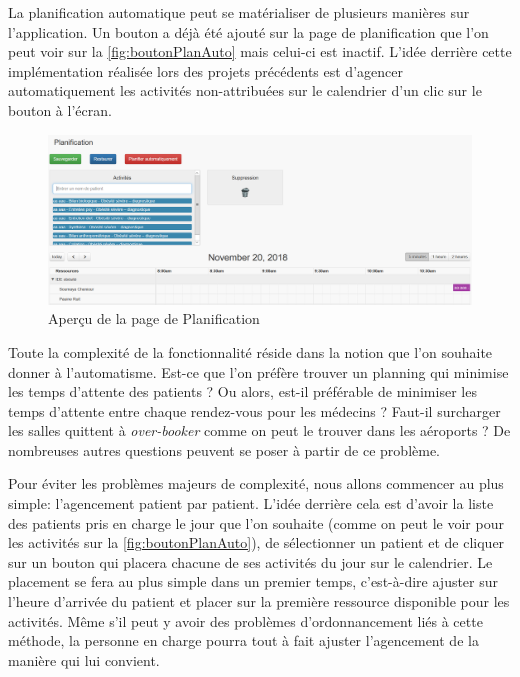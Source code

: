 \documentclass[noposter]{polytech/polytech}
\begin{document}
La planification automatique peut se matérialiser de plusieurs manières sur l'application. Un bouton a déjà été ajouté sur la page de planification que l'on peut voir sur la \autoref{fig:boutonPlanAuto} mais celui-ci est inactif. L'idée derrière cette implémentation réalisée lors des projets précédents est d'agencer automatiquement les activités non-attribuées sur le calendrier d'un clic sur le bouton à l'écran. 

\begin{figure}
	\includegraphics[scale=0.4]{images/bouton_plan_auto}
	\caption{Aperçu de la page de Planification}
	\label{fig:boutonPlanAuto}
\end{figure}

Toute la complexité de la fonctionnalité réside dans la notion que l'on souhaite donner à l'automatisme. Est-ce que l'on préfère trouver un planning qui minimise les temps d'attente des patients ? Ou alors, est-il préférable de minimiser les temps d'attente entre chaque rendez-vous pour les médecins ? Faut-il surcharger les salles quittent à \textit{over-booker} comme on peut le trouver dans les aéroports ? De nombreuses autres questions peuvent se poser à partir de ce problème.

Pour éviter les problèmes majeurs de complexité, nous allons commencer au plus simple: l'agencement patient par patient. L'idée derrière cela est d'avoir la liste des patients pris en charge le jour que l'on souhaite (comme on peut le voir pour les activités sur la \autoref{fig:boutonPlanAuto}), de sélectionner un patient et de cliquer sur un bouton qui placera chacune de ses activités du jour sur le calendrier. Le placement se fera au plus simple dans un premier temps, c'est-à-dire ajuster sur l'heure d'arrivée du patient et placer sur la première ressource disponible pour les activités. Même s'il peut y avoir des problèmes d'ordonnancement liés à cette méthode, la personne en charge pourra tout à fait ajuster l'agencement de la manière qui lui convient.
\end{document}
